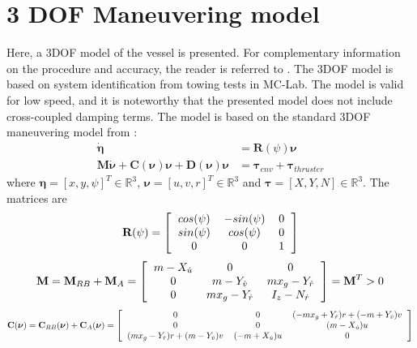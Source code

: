 \section{3 DOF Maneuvering model}
Here, a 3DOF model of the vessel is presented. For complementary information on the procedure and accuracy, the reader is referred to \cite{bjorno2016thruster}. The 3DOF model is based on system identification from towing tests in MC-Lab. The model is valid for low speed, and it is noteworthy that the presented model does not include cross-coupled damping terms. The model is based on the standard 3DOF maneuvering model from \cite{fossen2011handbook}: 
\begin{align}
	\bm{\dot{\eta}}&=\textbf{R}(\psi)\bm{\nu}\\
	\textbf{M}\bm{\dot{\nu}+\textbf{C}(\bm{\nu})\bm{\nu}+\textbf{D}(\bm{\nu})\bm{\nu}}&=\bm{\tau}_{env}+\bm{\tau}_{thruster}
\end{align}
where $\bm{\eta}=[x,y,\psi]^T \in \mathbb{R}^3$, $\bm{\nu}=[u,v,r]^T \in \mathbb{R}^3$ and $\bm{\tau}=[X,Y,N]\in \mathbb{R}^3$. The matrices are
\begin{equation}
	\textbf{R}(\psi)=\left[ \begin{tabular}{ccc}
	$cos(\psi)$ & $-sin(\psi)$ & 0\\
	$sin (\psi)$ & $cos (\psi)$ & 0\\
	0 & 0 & 1
	\end{tabular} \right]
\end{equation}
\begin{equation}
	\textbf{M}=\textbf{M}_{RB}+\textbf{M}_{A}=\left[ \begin{tabular}{ccc}
	$m-X_{\dot{u}}$ & 0 & 0\\
	0 & $m-Y_{\dot{v}}$ & $mx_g-Y_{\dot{r}}$\\
	0 & $mx_g-Y_{\dot{r}}$ & $I_z-N_{\dot{r}}$ 
	\end{tabular} \right] = \textbf{M}^T > 0
\end{equation}
\begin{equation}
	\textbf{C}(\bm{\nu})= \textbf{C}_{RB}(\bm{\nu})+\textbf{C}_A(\bm{\nu})=\left[ \begin{tabular}{ccc}
	0 & $ 0 $ & $(-mx_g+Y_{\dot{r}})r+(-m+Y_{\dot{v}})v$\\
	0 & 0 & $(m-X_{\dot{u}})u$\\
	$(mx_g-Y_{\dot{r}})r+(m-Y_{\dot{v}})v $ & $(-m+X_{\dot{u}})u$ & 0\\
	\end{tabular} \right]
\end{equation}
